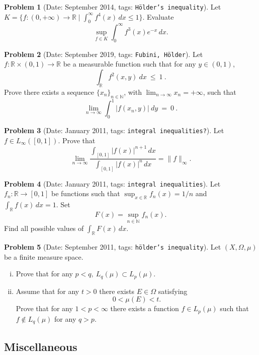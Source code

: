 \documentclass[11pt, notitlepage]{article}
\theoremstyle{definition}
\theoremstyle{definition}
\theoremstyle{definition}
\newtheorem{probstate}{Problem}
\theoremstyle{remark}
\newenvironment{problem}[2]{
    \begin{probstate}[Date: #1, tags: \texttt{#2}]
}
{
  \end{probstate}
}
\newcommand{\R}{\mathbb{R}}
\begin{document}
\begin{problem}{September 2014}{H\"older's inequality}
Let $K=\{f :(0,+\infty) \to \R \mid \int_0^{\infty} f^4(x) \, dx \le 1  \}$. Evaluate
\[
  \sup_{f \in K} \int_0^\infty f^3(x) e^{-x}  \, dx.
\]
\end{problem}

\begin{problem}{September 2019}{Fubini, Hölder}
    Let $f:\mathbb{R}\times (0,1)\to\mathbb{R}$ be a measurable function such that for any $y\in(0,1)$,
$$\int_{\mathbb{R}} f^2(x,y) \ dx \ \le \ 1\  .
$$
Prove there exists a sequence $\{x_n\}_{n\in\mathbb{N}}$, with $\lim_{n\to\infty}x_n=+\infty$, such that
$$\lim_{n\to\infty} \int_0^1 |f(x_n,y)| \ dy \ = \ 0 \  .
$$
\end{problem}

\begin{problem}{January 2011}{integral inequalities?}
  Let $f \in L_{\infty}([0,1])$. Prove that
 \[
   \lim_{n \to \infty} \frac{\int_{[0,1]} |f(x)|^{n+1} \, dx}{\int_{[0,1]} |f(x)|^{n} \, dx} = \|f\|_{\infty}.
 \]
\end{problem}

\begin{problem}{January 2011}{integral inequalities}
  Let $f_n: \mathbb{R} \to [0, 1]$ be functions such that
 $\sup_{x \in \mathbb{R}} f_n(x)=1/n$ and $\int_{\mathbb{R}} f(x) \, dx=1$. Set
 \[
  F(x)= \sup_{n \in \mathbb{N}} f_n(x).
 \]
 Find all possible values of $\int_{\mathbb{R}} F(x) \, dx$.

\end{problem}

\begin{problem}{September 2011}{hölder's inequality}
  Let $(X,\Omega, \mu)$ be a finite measure space.
 \begin{enumerate}[(i)]
   \item Prove that for any $p<q, \ L_q(\mu) \subset L_p(\mu)$.
   \item Assume that for any
 $t>0$ there exists $E \in \Omega$ satisfying
 \[
  0< \mu(E) <t.
 \]
 Prove that for any $1<p< \infty$ there exists a function $f \in
 L_p(\mu)$ such that $f \notin L_q(\mu)$ for any $q>p$.
\end{enumerate}
\end{problem}


\subsection{Miscellaneous}
\end{document}
